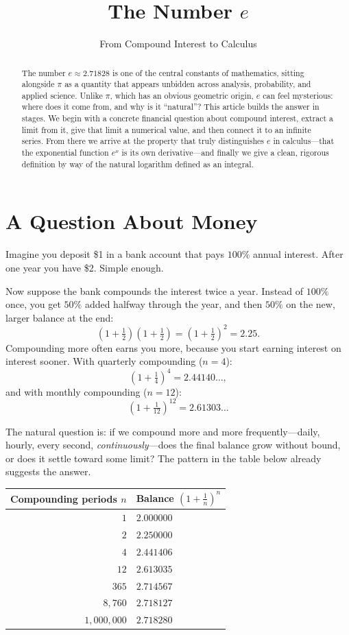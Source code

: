 \documentclass{essay}
\title{The Number $e$}
\subtitle{From Compound Interest to Calculus}
\author{}
\date{}
\begin{document}
\maketitle

\begin{abstract}
  \noindent The number $e \approx 2.71828$ is one of the central constants of mathematics, sitting alongside $\pi$ as a quantity that appears unbidden across analysis, probability, and applied science. Unlike $\pi$, which has an obvious geometric origin, $e$ can feel mysterious: where does it come from, and why is it ``natural''? This article builds the answer in stages. We begin with a concrete financial question about compound interest, extract a limit from it, give that limit a numerical value, and then connect it to an infinite series. From there we arrive at the property that truly distinguishes $e$ in calculus---that the exponential function $e^x$ is its own derivative---and finally we give a clean, rigorous definition by way of the natural logarithm defined as an integral.
\end{abstract}

\section{A Question About Money}

Imagine you deposit \$1 in a bank account that pays $100\%$ annual interest. After one year you have \$2. Simple enough.

Now suppose the bank compounds the interest twice a year. Instead of $100\%$ once, you get $50\%$ added halfway through the year, and then $50\%$ on the new, larger balance at the end:
\[
  \left(1 + \tfrac{1}{2}\right)\left(1 + \tfrac{1}{2}\right) = \left(1 + \tfrac{1}{2}\right)^2 = 2.25.
\]
Compounding more often earns you more, because you start earning interest on interest sooner. With quarterly compounding ($n = 4$):
\[
  \left(1 + \tfrac{1}{4}\right)^4 = 2.44140\ldots,
\]
and with monthly compounding ($n = 12$):
\[
  \left(1 + \tfrac{1}{12}\right)^{12} = 2.61303\ldots
\]

The natural question is: if we compound more and more frequently---daily, hourly, every second, \emph{continuously}---does the final balance grow without bound, or does it settle toward some limit? The pattern in the table below already suggests the answer.

\begin{center}
  \begin{tabular}{rl}
    \hline
    Compounding periods $n$ & Balance $\left(1 + \tfrac{1}{n}\right)^n$ \\
    \hline
    $1$ & $2.000000$ \\
    $2$ & $2.250000$ \\
    $4$ & $2.441406$ \\
    $12$ & $2.613035$ \\
    $365$ & $2.714567$ \\
    $8{,}760$ & $2.718127$ \\
    $1{,}000{,}000$ & $2.718280$ \\
    \hline
  \end{tabular}
\end{center}
\end{document}
